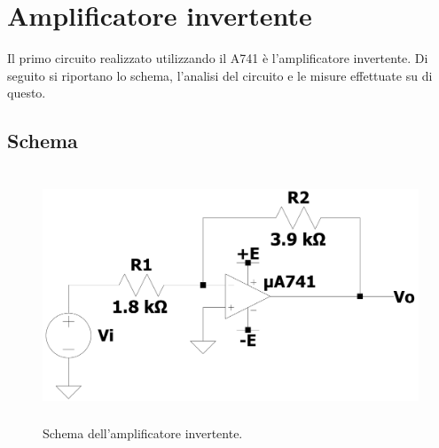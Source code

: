 \documentclass{report}
\begin{document}
\section{Amplificatore invertente} \label{amplinv_cap} 
Il primo circuito realizzato utilizzando il \textmu A741 è l'amplificatore invertente. Di seguito si riportano lo schema, l'analisi del circuito e le misure effettuate su di questo.
\subsection{Schema} 
\begin{figure}[h]
\centering
\includegraphics[height=7.5cm]{immagini/amplinv}
\caption{Schema dell'amplificatore invertente.}
\label{figura:amplinv}
\end{figure}
\end{document}
